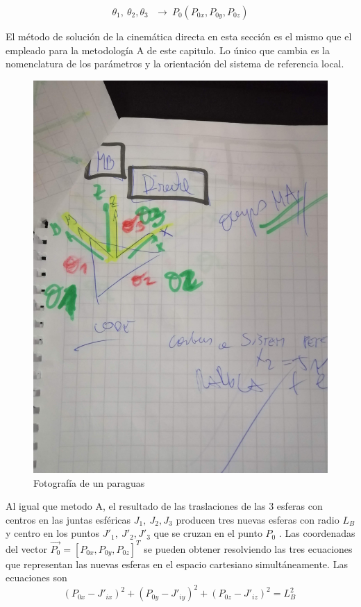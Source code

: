         \begin{equation}
            \theta _{1},~ \theta _{2}, \theta _{3}~~~ \rightarrow ~  {P_{0}} \left( P_{0x},P_{0y},P_{0z} \right)
        \label{eq:cap4_MB_1}
        \end{equation}

        El método de solución de la cinemática directa en esta sección es el mismo que el empleado para la metodología A de este capitulo. Lo único que cambia es la nomenclatura de los parámetros y la orientación del sistema de referencia local.
        
            \begin{figure}[htb]
                 \centering
               \includegraphics[width=0.5\linewidth]{Main/Chapter4/Images4/mb_direct.jpg}
                 
                  \caption{Fotografía de un paraguas}
                  \label{f:Cap4_Metodo_B_Modelacion_Cinematica_Posicion_3}
            \end{figure}        
        
    Al igual que metodo A, el resultado de las traslaciones de las 3 esferas con centros en las juntas esféricas  \( J_{1},~J_{2},J_{3} \)  producen tres nuevas esferas con radio  \( L_{B} \)  y centro en los puntos  \( J'_{1},~J'_{2},J'_{3} \)   que se cruzan en el punto  \( P_{0} \) . Las coordenadas del vector  \( \overrightarrow{P_{0}}=  \left[ P_{0x},P_{0y},P_{0z} \right] ^{T} \)  se pueden obtener resolviendo las tres ecuaciones que representan las nuevas esferas en el espacio cartesiano simultáneamente. Las ecuaciones son        
        \begin{equation}
            \left( P_{0x}-J'_{ix} \right) ^{2}+ \left( P_{0y}-J'_{iy} \right) ^{2}+ \left( P_{0z}-J'_{iz} \right) ^{2}=L_{B}^{2}~
        \label{eq:cap4_MB_2}
        \end{equation}        
  

